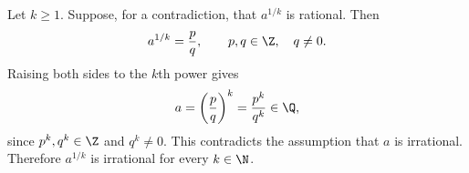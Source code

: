 Let $k\ge1$. Suppose, for a contradiction, that $a^{1/k}$ is
rational. Then
\[
  a^{1/k}=\frac pq,
  \qquad p,q\in\Z,\quad q\ne0.
\]
Raising both sides to the $k$th power gives
\[
  a=\left(\frac pq\right)^k=\frac{p^k}{q^k}\in\Q,
\]
since $p^k,q^k\in\Z$ and $q^k\ne0$. This contradicts the
assumption that $a$ is irrational. Therefore $a^{1/k}$ is
irrational for every $k\in\N$.

